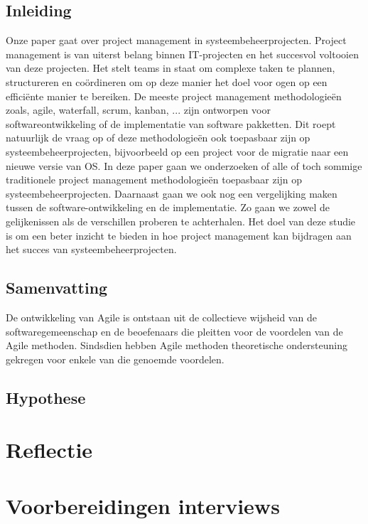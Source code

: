 \documentclass{article}
\begin{document}
    \subsection{Inleiding}
    Onze paper gaat over project management in systeembeheerprojecten. 
    Project management is van uiterst belang binnen IT-projecten en het succesvol voltooien van deze projecten. 
    Het stelt teams in staat om complexe taken te plannen, structureren en coördineren om op deze manier het doel voor ogen op een efficiënte manier te bereiken. \newline
    De meeste project management methodologieën zoals, agile, waterfall, scrum, kanban, ... zijn ontworpen voor softwareontwikkeling of de implementatie van software pakketten.
    Dit roept natuurlijk de vraag op of deze methodologieën ook toepasbaar zijn op systeembeheerprojecten, bijvoorbeeld op een project voor de migratie naar een nieuwe versie van OS. \newline
    In deze paper gaan we onderzoeken of alle of toch sommige traditionele project management methodologieën toepasbaar zijn op systeembeheerprojecten.
    Daarnaast gaan we ook nog een vergelijking maken tussen de software-ontwikkeling en de implementatie.
    Zo gaan we zowel de gelijkenissen als de verschillen proberen te achterhalen. \newline
    Het doel van deze studie is om een beter inzicht te bieden in hoe project management kan bijdragen aan het succes van systeembeheerprojecten. 

    \subsection{Samenvatting}
    De ontwikkeling van Agile is ontstaan ​​uit de collectieve wijsheid van de softwaregemeenschap en de beoefenaars die pleitten voor de voordelen van de Agile methoden. 
    Sindsdien hebben Agile methoden theoretische ondersteuning gekregen voor enkele van die genoemde voordelen. \autocite{STRAY2022107058}

    \subsection{Hypothese}

    \section{Reflectie}

    \section{Voorbereidingen interviews}
\end{document}
